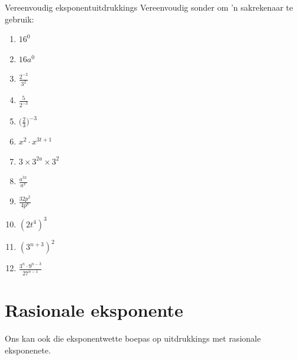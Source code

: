 \begin{exercises}{Vereenvoudig eksponentuitdrukkings}
Vereenvoudig sonder om ’n sakrekenaar te gebruik:
\begin{multicols}{2}
\begin{enumerate}[noitemsep, label=\textbf{\arabic*}., itemsep=5pt]
 \item $16^0$
 \item $16a^0$
 \item $\frac{2^{-2}}{3^2}$
 \item $ \frac{5}{2^{-3}}$
 \item $ \Big(\frac{2}{3}\Big)^{-3} $
 \item $ x^2 \cdot x^{3t+1} $
 \item $ 3 \times 3^{2a} \times 3^2$
 \item $ \frac{a^{3x}}{a^x} $
 \item $ \frac{32p^2}{4p^8}$
 \item $ (2t^4)^3$
 \item $ (3^{n+3})^2$
 \item $ \frac{3^n \cdot 9^{n-3}}{27^{n-1}}$
\end{enumerate}
\end{multicols}

 






\end{exercises}




\section{Rasionale eksponente}

Ons kan ook die eksponentwette boepas op uitdrukkings met rasionale eksponenete.

